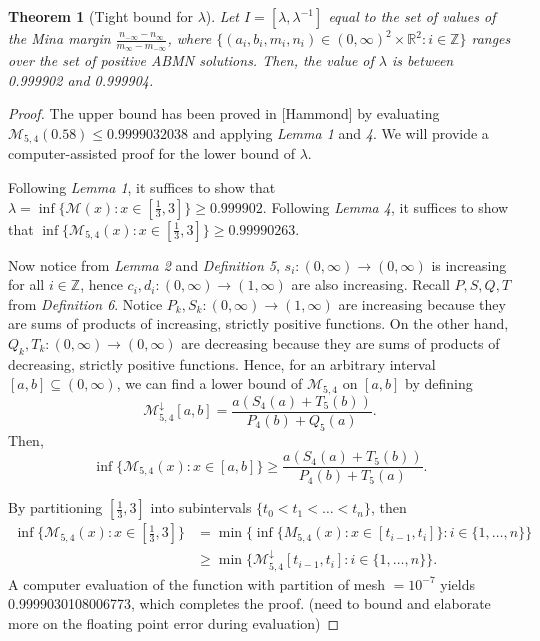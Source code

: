 \documentclass{article}
\newtheorem{theorem}{Theorem}
\newcommand*{\R}{\mathbb{R}}
\newcommand*{\Z}{\mathbb{Z}}
\newcommand*{\M}{\mathcal{M}}
\begin{document}
\begin{theorem}[Tight bound for $\lambda$]
    Let $I=[\lambda,\lambda^{-1}]$ equal to the set of values of the Mina margin
    $\frac{n_{-\infty}-n_{\infty}}{m_{\infty}-m_{-\infty}}$, where $\{(a_i, b_i, m_i,
    n_i)\in(0,\infty)^2\times \R^2:i\in\mathbb{Z}\}$ ranges over the set of positive ABMN solutions.
    Then, the value of $\lambda$ is between 0.999902 and 0.999904.
\end{theorem}
\begin{proof}
    The upper bound has been proved in [Hammond] by evaluating $\M_{5,4}(0.58)\leq0.9999032038$ and
    applying \emph{Lemma 1} and \emph{4}. We will provide a computer-assisted proof for the lower
    bound of $\lambda$.

    Following \emph{Lemma 1}, it suffices to show that
    $\lambda=\inf\{\M(x):x\in[\frac{1}{3},3]\}\geq0.999902$. Following \emph{Lemma 4}, it suffices
    to show that $\inf\{\M_{5,4}(x):x\in[\frac{1}{3},3]\}\geq 0.99990263$.

    Now notice from \emph{Lemma 2} and \emph{Definition 5}, $s_i:(0,\infty)\to(0,\infty)$ is
    increasing for all $i\in\Z$, hence $c_i, d_i:(0,\infty)\to(1,\infty)$ are also increasing.
    Recall $P,S,Q,T$ from \emph{Definition 6}. Notice $P_k, S_k:(0,\infty)\to(1,\infty)$ are
    increasing because they are sums of products of increasing, strictly positive functions. On the other hand,
    $Q_k,T_k:(0,\infty)\to(0,\infty)$ are decreasing because they are sums of products of decreasing, strictly positive
    functions. Hence, for an arbitrary interval $[a,b]\subseteq(0,\infty)$, we can find a
    lower bound of $\M_{5,4}$ on $[a,b]$ by defining
    $$\M^\downarrow_{5,4}[a,b]=\frac{a(S_4(a)+T_5(b))}{P_4(b)+Q_5(a)}.$$ Then,
    $$\inf\{\M_{5,4}(x):x\in[a,b]\}\geq\frac{a(S_4(a)+T_5(b))}{P_4(b)+T_5(a)}.$$

    By partitioning $[\frac{1}{3},3]$ into subintervals $\{t_0<t_1<\dots<t_n\}$, then 
    \begin{align*}
        \inf\{\M_{5,4}(x):x\in[\frac{1}{3},3]\} & =
        \min\{\inf\{M_{5,4}(x):x\in[t_{i-1},t_i]\}:i\in\{1,\dots,n\}\} \\
        & \geq \min\{\M^\downarrow_{5,4}[t_{i-1},t_i]:i\in\{1,\dots,n\}\}.
    \end{align*}
    A computer evaluation of the function with partition of mesh $=10^{-7}$ yields
    0.9999030108006773, which completes the proof. (need to bound and elaborate more on the floating
    point error during evaluation)
\end{proof}
\end{document}
